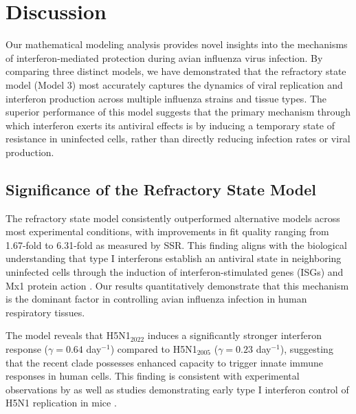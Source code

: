 \documentclass[12pt]{article}
\begin{document}


\section{Discussion}
Our mathematical modeling analysis provides novel insights into the mechanisms of interferon-mediated protection during avian influenza virus infection. By comparing three distinct models, we have demonstrated that the refractory state model (Model 3) most accurately captures the dynamics of viral replication and interferon production across multiple influenza strains and tissue types. The superior performance of this model suggests that the primary mechanism through which interferon exerts its antiviral effects is by inducing a temporary state of resistance in uninfected cells, rather than directly reducing infection rates or viral production.

\subsection{Significance of the Refractory State Model}
The refractory state model consistently outperformed alternative models across most experimental conditions, with improvements in fit quality ranging from 1.67-fold to 6.31-fold as measured by SSR. This finding aligns with the biological understanding that type I interferons establish an antiviral state in neighboring uninfected cells through the induction of interferon-stimulated genes (ISGs) and Mx1 protein action \cite{sun19,shao15,bazhan99}. Our results quantitatively demonstrate that this mechanism is the dominant factor in controlling avian influenza infection in human respiratory tissues.

The model reveals that H5N1$_{2022}$ induces a significantly stronger interferon response ($\gamma = 0.64$ day$^{-1}$) compared to H5N1$_{2005}$ ($\gamma = 0.23$ day$^{-1}$), suggesting that the recent clade possesses enhanced capacity to trigger innate immune responses in human cells. This finding is consistent with experimental observations by \cite{bauer24} as well as studies demonstrating early type I interferon control of H5N1 replication in mice \cite{szretter09}.
\end{document}
